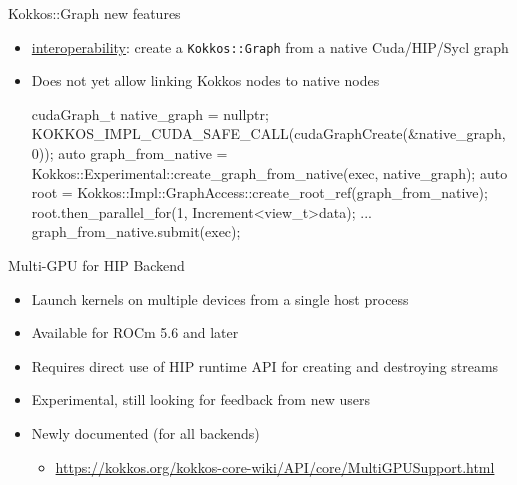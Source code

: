 \begin{frame}[fragile]{Kokkos::Graph new features}
 \begin{itemize}
   \item \href{https://github.com/kokkos/kokkos/pull/7664}{interoperability}: create a \texttt{Kokkos::Graph} from a native Cuda/HIP/Sycl graph
   \item Does not yet allow linking Kokkos nodes to native nodes
     \begin{code}[keywords={auto}]
cudaGraph_t native_graph = nullptr;
KOKKOS_IMPL_CUDA_SAFE_CALL(cudaGraphCreate(&native_graph, 0));
auto graph_from_native =
  Kokkos::Experimental::create_graph_from_native(exec, native_graph);
auto root = Kokkos::Impl::GraphAccess::create_root_ref(graph_from_native);
root.then_parallel_for(1, Increment<view_t>{data});
...
graph_from_native.submit(exec);
     \end{code}
 \end{itemize}
\end{frame}





\begin{frame}[fragile]{Multi-GPU for HIP Backend}
  \begin{itemize}
    \item Launch kernels on multiple devices from a single host process
    \item Available for ROCm 5.6 and later
    \item Requires direct use of HIP runtime API for creating and destroying streams
    \item Experimental, still looking for feedback from new users
    \item Newly documented (for all backends)  
      \begin{itemize} 
        \item[] \url{https://kokkos.org/kokkos-core-wiki/API/core/MultiGPUSupport.html}
      \end{itemize}
  \end{itemize}
\end{frame}

